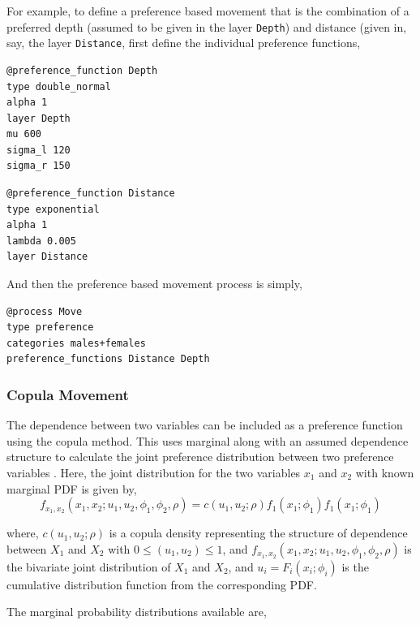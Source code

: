 For example, to define a preference based movement that is the combination of a preferred depth (assumed to be given in the layer \texttt{Depth}) and distance (given in, say, the layer \texttt{Distance}, first define the individual preference functions,

{\small{\begin{verbatim}
@preference_function Depth
type double_normal
alpha 1
layer Depth
mu 600
sigma_l 120
sigma_r 150
\end{verbatim}}}

{\small{\begin{verbatim}
@preference_function Distance
type exponential
alpha 1
lambda 0.005
layer Distance
\end{verbatim}}}

And then the preference based movement process is simply,

{\small{\begin{verbatim}
@process Move
type preference
categories males+females
preference_functions Distance Depth
\end{verbatim}}}

\subsubsection*{Copula Movement}

The dependence between two variables can be included as a preference function using the copula method. This uses marginal  along with an assumed dependence structure to calculate the joint preference distribution between two preference variables \citep{Marsh2015}. Here, the joint distribution for the two variables $x_1$ and $x_2$ with known marginal PDF is given by,
\begin{equation}
  f_{x_1,x_2}(x_1,x_2;u_1,u_2,\phi_1,\phi_2,\rho) = c(u_1,u_2;\rho)f_1(x_1;\phi_1)f_1(x_1;\phi_1)
\end{equation}

where, $c(u_1,u_2;\rho)$ is a copula density representing the structure of dependence between $X_1$ and $X_2$ with $0\leq (u_1,u_2) \leq 1$, and $f_{x_1,x_2}(x_1,x_2;u_1,u_2,\phi_1,\phi_2,\rho)$ is the bivariate joint distribution of $X_1$ and $X_2$, and $u_i = F_i(x_i;\phi_i)$ is the cumulative distribution function from the corresponding PDF.

The marginal probability distributions available are,

